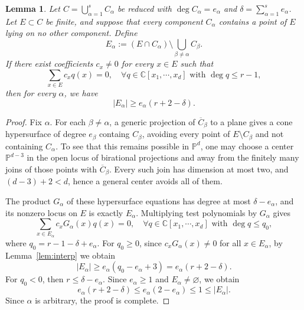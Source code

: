 \documentclass[11pt,reqno]{amsart}
\newcommand\C{\ensuremath{\mathbb{C}}}
\newtheorem{lemma}[theorem]{Lemma}
\theoremstyle{definition}
\theoremstyle{plain}
\numberwithin{equation}{section}
\begin{document}
\begin{lemma}\label{lem:packets}
    Let $C=\bigcup_{\alpha=1}^sC_\alpha$ be reduced with $\deg C_\alpha =e_\alpha$ and $\delta=\sum_{\alpha=1}^s e_\alpha$. Let $E\subset C$ be finite, and suppose that every component $C_\alpha$ contains a point of $E$ lying on no other component. Define
    \begin{equation*}
        E_\alpha:=(E\cap C_\alpha)\setminus \bigcup_{\beta\neq \alpha}C_\beta.
    \end{equation*}
    If there exist coefficients $c_x\neq 0$ for every $x\in E$ such that
    \begin{equation*}
        \sum_{x\in E}c_xq(x)=0,\quad \forall q\in \C[x_1,\cdots,x_d] \text{ with }\deg q\le r-1,
    \end{equation*}
    then for every $\alpha$, we have
    \begin{equation*}
        |E_\alpha|\ge e_\alpha (r+2-\delta).
    \end{equation*}
\end{lemma}
\begin{proof}
    Fix $\alpha$. For each $\beta\neq \alpha$, a generic projection of $\overline{C}_\beta$ to a plane gives a cone hypersurface of degree $e_\beta$ containg $C_\beta$, avoiding every point of $E\setminus C_\beta$ and not containing $C_\alpha$. To see that this remains possible in $\mathbb{P}^d$, one may choose a center $\mathbb{P}^{d-3}$ in the open locus of birational projections and away from the finitely many joins of those points with $\overline{C}_\beta$. Every such join has dimension at most two, and $(d-3)+2<d$, hence a general center avoids all of them.

    The product $G_\alpha$ of these hypersurface equations has degree at most $\delta-e_\alpha$, and its nonzero locus on $E$ is exactly $E_\alpha$. Multiplying test polynomials by $G_\alpha$ gives
    \begin{equation*}
        \sum_{x\in E_\alpha}c_xG_\alpha(x)q(x)=0, \quad \forall q\in \C[x_1,\cdots,x_d] \text{ with }\deg q\le q_0,
    \end{equation*}
    where $q_0=r-1-\delta+e_\alpha$. For $q_0\ge 0$, since $c_xG_\alpha(x)\neq 0$ for all $x\in E_\alpha$, by Lemma~\ref{lem:interp} we obtain
    \begin{equation*}
        |E_\alpha|\ge e_\alpha (q_0-e_\alpha+3)=e_\alpha(r+2-\delta).
    \end{equation*} 
    For $q_0<0$, then $r\le \delta-e_\alpha$. Since $e_\alpha\ge 1$ and $E_\alpha\neq \varnothing$, we obtain
    \begin{equation*}
        e_\alpha(r+2-\delta)\le e_\alpha(2-e_\alpha)\le 1\le |E_\alpha|.
    \end{equation*}
    Since $\alpha$ is arbitrary, the proof is complete.
\end{proof}
\end{document}
